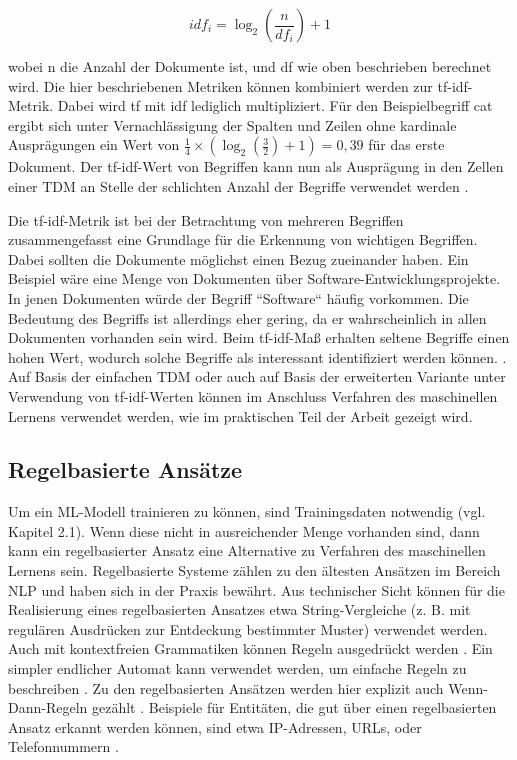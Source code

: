 \[ idf_i = \log_2( \frac{n}{df_i}) + 1 \]

wobei n die Anzahl der Dokumente ist, und df wie oben beschrieben berechnet wird. Die hier beschriebenen Metriken können kombiniert werden zur tf-idf-Metrik. Dabei wird tf mit idf lediglich multipliziert. Für den Beispielbegriff cat ergibt sich unter Vernachlässigung der Spalten und Zeilen ohne kardinale Ausprägungen ein Wert von \( \frac{1}{4} \times ( \log_2( \frac{3}{2} )+1)=0,39 \) 
für das erste Dokument. Der tf-idf-Wert von Begriffen kann nun als Ausprägung in den Zellen einer TDM an Stelle der schlichten Anzahl der Begriffe verwendet werden \cite[S. 61-73]{Anandarajan}.

Die tf-idf-Metrik ist bei der Betrachtung von mehreren Begriffen zusammengefasst eine Grundlage für die Erkennung von wichtigen Begriffen. Dabei sollten die Dokumente möglichst einen Bezug zueinander haben. Ein Beispiel wäre eine Menge von Dokumenten über Software-Entwicklungsprojekte. In jenen Dokumenten würde der Begriff ``Software`` häufig vorkommen. Die Bedeutung des Begriffs ist allerdings eher gering, da er wahrscheinlich in allen Dokumenten vorhanden sein wird. Beim tf-idf-Maß erhalten seltene Begriffe einen hohen Wert, wodurch solche Begriffe als interessant identifiziert werden können. \cite[S. 107-110]{Manning}. Auf Basis der einfachen TDM oder auch auf Basis der erweiterten Variante unter Verwendung von tf-idf-Werten können im Anschluss Verfahren des maschinellen Lernens verwendet werden, wie im praktischen Teil der Arbeit gezeigt wird.  

\subsection{Regelbasierte Ansätze}

Um ein ML-Modell trainieren zu können, sind Trainingsdaten notwendig (vgl. Kapitel 2.1). Wenn diese nicht in ausreichender Menge vorhanden sind, dann kann ein regelbasierter Ansatz eine Alternative zu Verfahren des maschinellen Lernens sein. Regelbasierte Systeme zählen zu den ältesten Ansätzen im Bereich NLP und haben sich in der Praxis bewährt. Aus technischer Sicht können für die Realisierung eines regelbasierten Ansatzes etwa String-Vergleiche (z. B. mit regulären Ausdrücken zur Entdeckung bestimmter Muster) verwendet werden. Auch mit kontextfreien Grammatiken können Regeln ausgedrückt werden \cite{kaggle}. Ein simpler endlicher Automat kann verwendet werden, um einfache Regeln zu beschreiben \cite[S. 219]{Manning}. Zu den regelbasierten Ansätzen werden hier explizit auch Wenn-Dann-Regeln gezählt \cite[S. 23ff.]{Ertel}. Beispiele für Entitäten, die gut über einen regelbasierten Ansatz erkannt werden können, sind etwa IP-Adressen, URLs, oder Telefonnummern \cite{spacy}.

